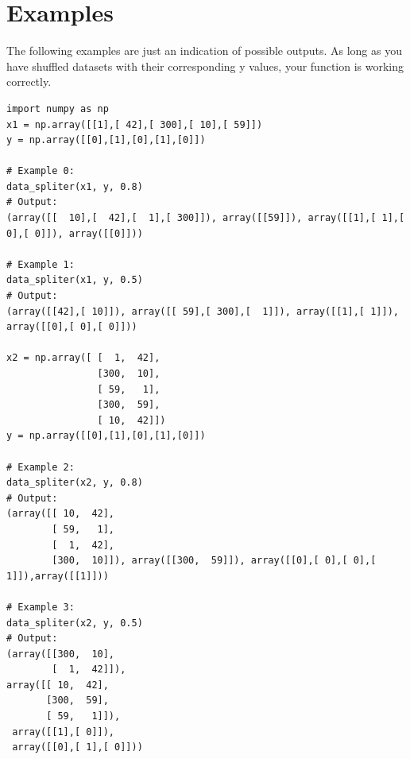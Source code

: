 \documentclass{42-en}
\begin{document}

\section*{Examples}
The following examples are just an indication of possible outputs. As long as you have shuffled datasets with their corresponding y values, your function is working correctly.

\begin{verbatim}
import numpy as np
x1 = np.array([[1],[ 42],[ 300],[ 10],[ 59]])
y = np.array([[0],[1],[0],[1],[0]])

# Example 0:
data_spliter(x1, y, 0.8)
# Output:
(array([[  10],[  42],[  1],[ 300]]), array([[59]]), array([[1],[ 1],[ 0],[ 0]]), array([[0]]))

# Example 1:
data_spliter(x1, y, 0.5)
# Output:
(array([[42],[ 10]]), array([[ 59],[ 300],[  1]]), array([[1],[ 1]]), array([[0],[ 0],[ 0]]))

x2 = np.array([ [  1,  42],
                [300,  10],
                [ 59,   1],
                [300,  59],
                [ 10,  42]])
y = np.array([[0],[1],[0],[1],[0]])

# Example 2:
data_spliter(x2, y, 0.8)
# Output:
(array([[ 10,  42],
        [ 59,   1],
        [  1,  42],
        [300,  10]]), array([[300,  59]]), array([[0],[ 0],[ 0],[ 1]]),array([[1]]))

# Example 3:
data_spliter(x2, y, 0.5)
# Output:
(array([[300,  10],
        [  1,  42]]),
array([[ 10,  42],
       [300,  59],
       [ 59,   1]]),
 array([[1],[ 0]]),
 array([[0],[ 1],[ 0]]))
\end{verbatim}



\newpage

\end{document}
